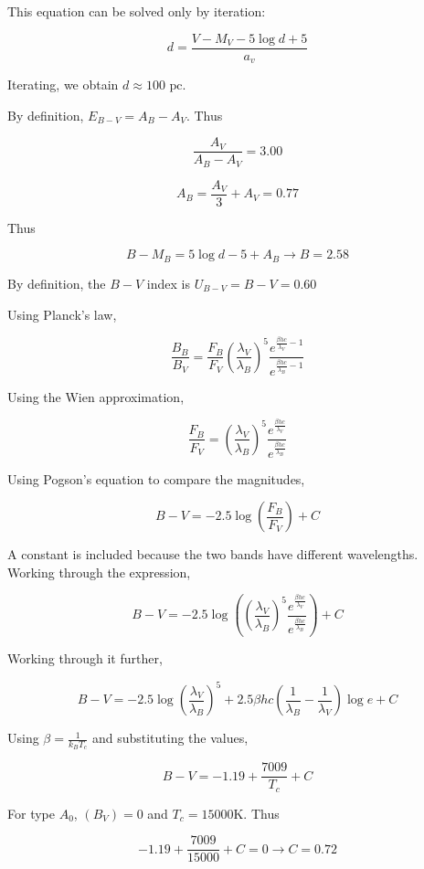 \documentclass[11pt]{article}
\begin{document}
\begin{pproblem}
\begin{pssolution*}{}{}
\begin{alternativas}
        This equation can be solved only by iteration:

        \[d = \frac{V-M_V - 5\log d + 5}{a_v}\]

        Iterating, we obtain \(\boxed{d\approx 100\text{ pc}}\).

        \item By definition, \(E_{B-V} = A_B - A_V\). Thus
        
        \[\frac{A_V}{A_B-A_V} = 3.00\]

        \[A_B = \frac{A_V}{3}+A_V = 0.77\]

        Thus

        \[B-M_B = 5\log d - 5 + A_B\rightarrow B = 2.58\]

        By definition, the \(B-V\) index is \(\boxed{U_{B-V} = B-V = 0.60}\)

        \item Using Planck's law,
        
        \[\frac{B_B}{B_V} = \frac{F_B}{F_V} \left(\frac{\lambda_V}{\lambda_B}\right)^5 \frac{e^{\frac{\beta hc}{\lambda_V}-1}}{e^{\frac{\beta hc}{\lambda_B}-1}}\]

        Using the Wien approximation,

        \[\frac{F_B}{F_V} = \left(\frac{\lambda_V}{\lambda_B}\right)^5 \frac{e^{\frac{\beta hc}{\lambda_V}}}{e^{\frac{\beta hc}{\lambda_B}}}\]

        Using Pogson's equation to compare the magnitudes,

        \[B-V = -2.5\log\left(\frac{F_B}{F_V}\right)+C\]

        A constant is included because the two bands have different wavelengths. Working through the expression,

        \[B-V = -2.5\log\left(\left(\frac{\lambda_V}{\lambda_B}\right)^5 \frac{e^{\frac{\beta hc}{\lambda_V}}}{e^{\frac{\beta hc}{\lambda_B}}}\right)+C\]

        Working through it further,

        \[B-V = -2.5\log\left(\frac{\lambda_V}{\lambda_B}\right)^5 + 2.5 \beta hc\left(\frac{1}{\lambda_B}-\frac{1}{\lambda_V}\right)\log e + C\]

        Using \(\beta = \frac{1}{k_B T_c}\) and substituting the values,

        \[B-V = -1.19 + \frac{7009}{T_c}+C\]

        For type \(A_0\), \((B_V)=0\) and \(T_c = 15000\)K. Thus

        \[-1.19 + \frac{7009}{15000} + C = 0 \rightarrow C = 0.72\]


\end{alternativas}
\end{pssolution*}
\end{pproblem}
\end{document}
